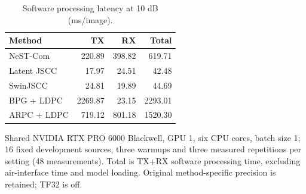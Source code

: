 \begin{table}[t]
\centering
\caption{Software processing latency at 10 dB (ms/image).}
\label{tab:latency}
\begingroup
\fontsize{8}{9.5}\selectfont
\setlength{\tabcolsep}{3pt}
\begin{tabular}{@{}l r r r@{}}
\toprule
Method & TX & RX & Total \\
\midrule
NeST-Com & 220.89 & 398.82 & 619.71 \\
Latent JSCC & 17.97 & 24.51 & 42.48 \\
SwinJSCC & 24.81 & 19.89 & 44.69 \\
BPG + LDPC & 2269.87 & 23.15 & 2293.01 \\
ARPC + LDPC & 719.12 & 801.18 & 1520.30 \\
\bottomrule
\end{tabular}
\endgroup
\par\smallskip
\begin{minipage}{\linewidth}\fontsize{7.5}{9}\selectfont
Shared NVIDIA RTX PRO 6000 Blackwell, GPU 1, six CPU cores, batch size 1; 16 fixed development sources, three warmups and three measured repetitions per setting (48 measurements). Total is TX+RX software processing time, excluding air-interface time and model loading. Original method-specific precision is retained; TF32 is off.
\end{minipage}
\end{table}
